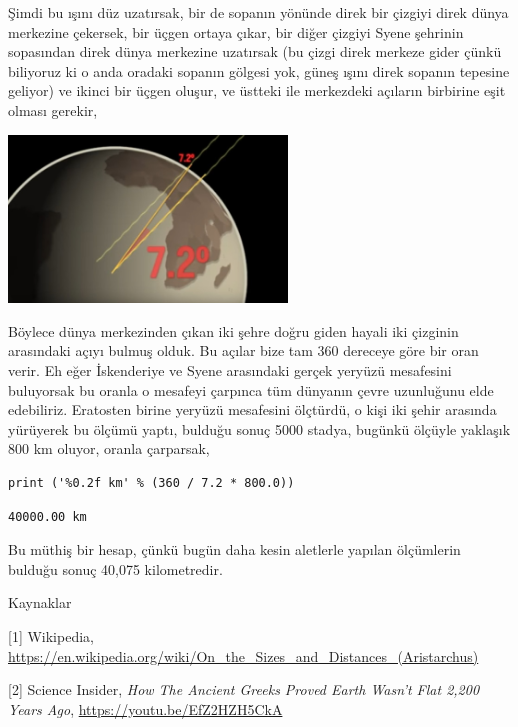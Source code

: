 \documentclass[12pt,fleqn]{article}\usepackage{../../common}
\begin{document}
Şimdi bu ışını düz uzatırsak, bir de sopanın yönünde direk bir çizgiyi direk
dünya merkezine çekersek, bir üçgen ortaya çıkar, bir diğer çizgiyi Syene
şehrinin sopasından direk dünya merkezine uzatırsak (bu çizgi direk merkeze
gider çünkü biliyoruz ki o anda oradaki sopanın gölgesi yok, güneş ışını direk
sopanın tepesine geliyor) ve ikinci bir üçgen oluşur, ve üstteki ile merkezdeki
açıların birbirine eşit olması gerekir,

\includegraphics[width=20em]{circum2.jpg}

Böylece dünya merkezinden çıkan iki şehre doğru giden hayali iki çizginin
arasındaki açıyı bulmuş olduk. Bu açılar bize tam 360 dereceye göre bir oran
verir. Eh eğer İskenderiye ve Syene arasındaki gerçek yeryüzü mesafesini
buluyorsak bu oranla o mesafeyi çarpınca tüm dünyanın çevre uzunluğunu elde
edebiliriz. Eratosten birine yeryüzü mesafesini ölçtürdü, o kişi iki şehir
arasında yürüyerek bu ölçümü yaptı, bulduğu sonuç 5000 stadya, bugünkü
ölçüyle yaklaşık 800 km oluyor, oranla çarparsak,

\begin{verbatim}
print ('%0.2f km' % (360 / 7.2 * 800.0))
\end{verbatim}

\begin{verbatim}
40000.00 km
\end{verbatim}

Bu müthiş bir hesap, çünkü bugün daha kesin aletlerle yapılan ölçümlerin bulduğu
sonuç 40,075 kilometredir.

Kaynaklar

[1] Wikipedia,
    \url{https://en.wikipedia.org/wiki/On_the_Sizes_and_Distances_(Aristarchus)}

[2] Science Insider, {\em How The Ancient Greeks Proved Earth Wasn't Flat 2,200 Years Ago},
    \url{https://youtu.be/EfZ2HZH5CkA}
    
\end{document}
